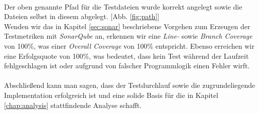 \\
Der oben genannte Pfad für die Testdateien wurde korrekt angelegt sowie die Dateien selbst in diesem abgelegt. [Abb. \ref{fig:path}]
\\
Wenden wir das in Kapitel \ref{sec:sonar} beschriebene Vorgehen zum Erzeugen der Testmetriken mit \textit{SonarQube} an, erkennen wir eine \textit{Line-} sowie \textit{Branch Coverage} von 100\%, was einer \textit{Overall Coverage} von 100\% entspricht. Ebenso erreichen wir eine Erfolgsquote von 100\%, was bedeutet, dass kein Test während der Laufzeit fehlgeschlagen ist oder aufgrund von falscher Programmlogik einen Fehler wirft.\\\\
Abschließend kann man sagen, dass der Testdurchlauf sowie die zugrundeliegende Implementation erfolgreich ist und eine solide Basis für die in Kapitel \ref{chap:analysis} stattfindende Analyse schafft.




